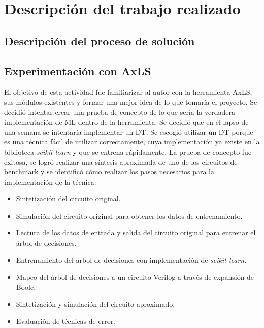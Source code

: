 \chapter{Descripción del trabajo realizado}


\section{Descripción del proceso de solución}


\section{Experimentación con AxLS}

El objetivo de esta actividad fue familiarizar al autor con la herramienta AxLS,
sus módulos existentes y formar una mejor idea de lo que tomaría el proyecto.
Se decidió intentar crear una prueba de concepto de lo que sería la verdadera
implementación de ML dentro de la herramienta.
Se decidió que en el lapso de una semana se intentaría implementar un DT. Se
escogió utilizar un DT porque es una técnica fácil de utilizar correctamente,
cuya implementación ya existe en la biblioteca \emph{scikit-learn} y que se
entrena rápidamente.
La prueba de concepto fue exitosa, se logró realizar una síntesis aproximada de
uno de los circuitos de benchmark y se identificó cómo realizar los pasos
necesarios para la implementación de la técnica:

\begin{itemize}
    \item Sintetización del circuito original.
    \item Simulación del circuito original para obtener los datos de entrenamiento.
    \item Lectura de los datos de entrada y salida del circuito original para
      entrenar el árbol de decisiones.
    \item Entrenamiento del árbol de decisiones con implementación de
      \emph{scikit-learn}.
    \item Mapeo del árbol de decisiones a un circuito Verilog a través de
      expansión de Boole.
    \item Sintetización y simulación del circuito aproximado.
    \item Evaluación de técnicas de error.
\end{itemize}

